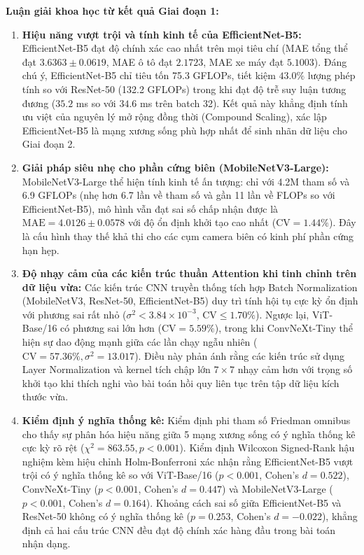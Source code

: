 \textbf{Luận giải khoa học từ kết quả Giai đoạn 1:}
\begin{enumerate}
    \item \textbf{Hiệu năng vượt trội và tính kinh tế của EfficientNet-B5:} EfficientNet-B5 đạt độ chính xác cao nhất trên mọi tiêu chí (MAE tổng thể đạt $3.6363 \pm 0.0619$, MAE ô tô đạt $2.1723$, MAE xe máy đạt $5.1003$). Đáng chú ý, EfficientNet-B5 chỉ tiêu tốn 75.3 GFLOPs, tiết kiệm $43.0\%$ lượng phép tính so với ResNet-50 (132.2 GFLOPs) trong khi đạt độ trễ suy luận tương đương ($35.2$ ms so với $34.6$ ms trên batch 32). Kết quả này khẳng định tính ưu việt của nguyên lý mở rộng đồng thời (Compound Scaling), xác lập EfficientNet-B5 là mạng xương sống phù hợp nhất để sinh nhãn dữ liệu cho Giai đoạn 2.
    \item \textbf{Giải pháp siêu nhẹ cho phần cứng biên (MobileNetV3-Large):} MobileNetV3-Large thể hiện tính kinh tế ấn tượng: chỉ với 4.2M tham số và 6.9 GFLOPs (nhẹ hơn 6.7 lần về tham số và gần 11 lần về FLOPs so với EfficientNet-B5), mô hình vẫn đạt sai số chấp nhận được là $\text{MAE} = 4.0126 \pm 0.0578$ với độ ổn định khởi tạo cao nhất ($\text{CV} = 1.44\%$). Đây là cấu hình thay thế khả thi cho các cụm camera biên có kinh phí phần cứng hạn hẹp.
    \item \textbf{Độ nhạy cảm của các kiến trúc thuần Attention khi tinh chỉnh trên dữ liệu vừa:} Các kiến trúc CNN truyền thống tích hợp Batch Normalization (MobileNetV3, ResNet-50, EfficientNet-B5) duy trì tính hội tụ cực kỳ ổn định với phương sai rất nhỏ ($\sigma^2 < 3.84 \times 10^{-3}$, $\text{CV} \le 1.70\%$). Ngược lại, ViT-Base/16 có phương sai lớn hơn ($\text{CV} = 5.59\%$), trong khi ConvNeXt-Tiny thể hiện sự dao động mạnh giữa các lần chạy ngẫu nhiên ($\text{CV} = 57.36\%, \sigma^2 = 13.017$). Điều này phản ánh rằng các kiến trúc sử dụng Layer Normalization và kernel tích chập lớn $7 \times 7$ nhạy cảm hơn với trọng số khởi tạo khi thích nghi vào bài toán hồi quy liên tục trên tập dữ liệu kích thước vừa.
    \item \textbf{Kiểm định ý nghĩa thống kê:} Kiểm định phi tham số Friedman omnibus cho thấy sự phân hóa hiệu năng giữa 5 mạng xương sống có ý nghĩa thống kê cực kỳ rõ rệt ($\chi^2 = 863.55, p < 0.001$). Kiểm định Wilcoxon Signed-Rank hậu nghiệm kèm hiệu chỉnh Holm-Bonferroni xác nhận rằng EfficientNet-B5 vượt trội có ý nghĩa thống kê so với ViT-Base/16 ($p < 0.001$, Cohen's $d = 0.522$), ConvNeXt-Tiny ($p < 0.001$, Cohen's $d = 0.447$) và MobileNetV3-Large ($p < 0.001$, Cohen's $d = 0.164$). Khoảng cách sai số giữa EfficientNet-B5 và ResNet-50 không có ý nghĩa thống kê ($p = 0.253$, Cohen's $d = -0.022$), khẳng định cả hai cấu trúc CNN đều đạt độ chính xác hàng đầu trong bài toán nhận dạng.
\end{enumerate}

